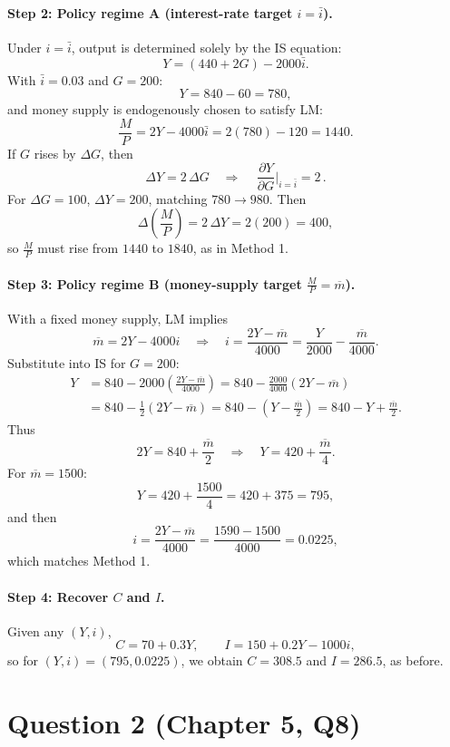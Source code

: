 \documentclass[12pt]{article}
\begin{document}
\paragraph{Step 2: Policy regime A (interest-rate target \(i=\bar i\)).}
Under \(i=\bar i\), output is determined solely by the IS equation:
\[
Y = (440+2G) - 2000\bar i.
\]
With \(\bar i=0.03\) and \(G=200\):
\[
Y = 840 - 60 = 780,
\]
and money supply is endogenously chosen to satisfy LM:
\[
\frac{M}{P}=2Y-4000\bar i=2(780)-120=1440.
\]
If \(G\) rises by \(\Delta G\), then
\[
\Delta Y = 2\,\Delta G
\quad\Rightarrow\quad
\boxed{\,\frac{\partial Y}{\partial G}\Big|_{i=\bar i}=2\, }.
\]
For \(\Delta G=100\), \(\Delta Y=200\), matching \(780\to 980\).
Then
\[
\Delta\left(\frac{M}{P}\right)
= 2\,\Delta Y
= 2(200)
= 400,
\]
so \(\frac{M}{P}\) must rise from \(1440\) to \(1840\), as in Method 1.

\paragraph{Step 3: Policy regime B (money-supply target \(\frac{M}{P}=\overline{m}\)).}
With a fixed money supply, LM implies
\[
\overline{m}=2Y-4000i
\quad\Longrightarrow\quad
i=\frac{2Y-\overline{m}}{4000}=\frac{Y}{2000}-\frac{\overline{m}}{4000}.
\]
Substitute into IS for \(G=200\):
\begin{align*}
Y &= 840 - 2000\left(\frac{2Y-\overline{m}}{4000}\right)
= 840 - \frac{2000}{4000}(2Y-\overline{m}) \\
&= 840 - \frac{1}{2}(2Y-\overline{m})
= 840 - (Y-\tfrac{\overline{m}}{2})
= 840 - Y + \frac{\overline{m}}{2}.
\end{align*}
Thus
\[
2Y = 840 + \frac{\overline{m}}{2}
\quad\Longrightarrow\quad
Y = 420 + \frac{\overline{m}}{4}.
\]
For \(\overline{m}=1500\):
\[
Y = 420 + \frac{1500}{4} = 420 + 375 = 795,
\]
and then
\[
i = \frac{2Y-\overline{m}}{4000}=\frac{1590-1500}{4000}=0.0225,
\]
which matches Method 1.

\paragraph{Step 4: Recover \(C\) and \(I\).}
Given any \((Y,i)\),
\[
C=70+0.3Y,\qquad I=150+0.2Y-1000i,
\]
so for \((Y,i)=(795,0.0225)\), we obtain \(C=308.5\) and \(I=286.5\), as before.

\newpage

\section*{Question 2 (Chapter 5, Q8)}
\end{document}

